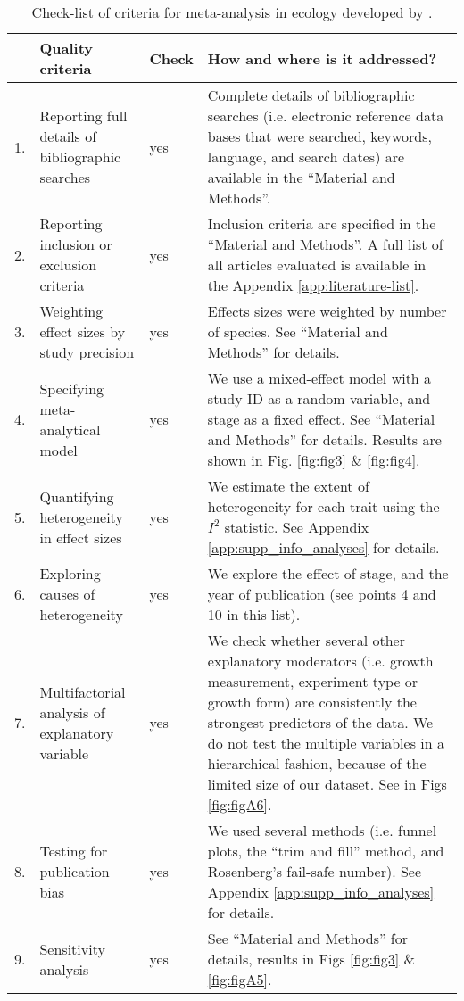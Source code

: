 \documentclass[a4paper,11pt]{article}
\begin{document}
\clearpage
\begin{table}[h!]
\centering
\caption{Check-list of criteria for meta-analysis in ecology developed by \citet{Koricheva:2014ku}.}
{\footnotesize
\vspace{0.5cm}
\begin{tabular}{p{0.2cm}p{4cm}p{0.8cm}p{7cm}}
  \hline
  & Quality criteria & Check & How and where is it addressed?\\
  \hline
  1.& Reporting full details of bibliographic searches & yes  & Complete details of bibliographic searches (i.e. electronic reference data bases that were searched, keywords, language, and search dates) are available in the ``Material and Methods''.\\
  2.& Reporting inclusion or exclusion criteria & yes & Inclusion criteria are specified in the ``Material and Methods''. A full list of all articles evaluated is available in the Appendix \ref{app:literature-list}.\\
  3.& Weighting effect sizes by study precision & yes & Effects sizes were weighted by number of species. See ``Material and Methods'' for details.\\
 4.& Specifying meta-analytical model & yes & We use a mixed-effect model with a study ID as a random variable, and stage as a fixed effect. See ``Material and Methods'' for details. Results are shown in Fig. \ref{fig:fig3} \& \ref{fig:fig4}.\\
 5.& Quantifying heterogeneity in effect sizes &  yes & We estimate the extent of heterogeneity for each trait using the $I^{2}$ statistic. See Appendix \ref{app:supp_info_analyses} for details.\\
 6.& Exploring causes of heterogeneity & yes &  We explore the effect of stage, and the year of publication (see points 4 and 10 in this list).\\
 7.& Multifactorial analysis of explanatory variable  & yes & We check whether several other explanatory moderators (i.e. growth measurement, experiment type or growth form) are consistently the strongest predictors of the data. We do not test the multiple variables in a hierarchical fashion, because of the limited size of our dataset. See in Figs \ref{fig:figA6}.\\
  8.& Testing for publication bias &  yes & We used several methods (i.e. funnel plots, the ``trim and fill'' method, and Rosenberg's fail-safe number). See Appendix \ref{app:supp_info_analyses} for details.\\
  9.& Sensitivity analysis &  yes &See ``Material and Methods'' for details, results in Figs \ref{fig:fig3} \& \ref{fig:figA5}.\\

\end{tabular}}
\end{table}
\end{document}
